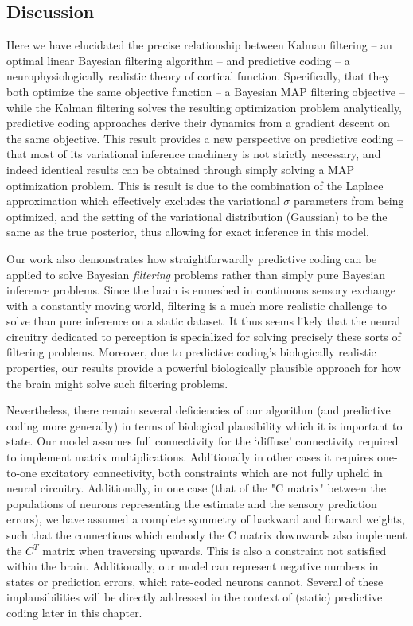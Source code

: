 \subsection{Discussion}

Here we have elucidated the precise relationship between Kalman filtering -- an optimal linear Bayesian filtering algorithm -- and predictive coding -- a neurophysiologically realistic theory of cortical function. Specifically, that they both optimize the same objective function -- a Bayesian MAP filtering objective -- while the Kalman filtering solves the resulting optimization problem analytically, predictive coding approaches derive their dynamics from a gradient descent on the same objective.  This result provides a new perspective on predictive coding -- that most of its variational inference machinery is not strictly necessary, and indeed identical results can be obtained through simply solving a MAP optimization problem. This is result is due to the combination of the Laplace approximation which effectively excludes the variational $\sigma$ parameters from being optimized, and the setting of the variational distribution (Gaussian) to be the same as the true posterior, thus allowing for exact inference in this model.

Our work also demonstrates how straightforwardly predictive coding can be applied to solve Bayesian \emph{filtering} problems rather than simply pure Bayesian inference problems. Since the brain is enmeshed in continuous sensory exchange with a constantly moving world, filtering is a much more realistic challenge to solve than pure inference on a static dataset. It thus seems likely that the neural circuitry dedicated to perception is specialized for solving precisely these sorts of filtering problems. Moreover, due to predictive coding's biologically realistic properties, our results provide a powerful biologically plausible approach for how the brain might solve such filtering problems.

Nevertheless, there remain several deficiencies of our algorithm (and predictive coding more generally) in terms of biological plausibility which it is important to state. Our model assumes full connectivity for the `diffuse' connectivity required to implement matrix multiplications. Additionally in other cases it requires one-to-one excitatory connectivity, both constraints which are not fully upheld in neural circuitry. Additionally, in one case (that of the "C matrix" between the populations of neurons representing the estimate and the sensory prediction errors), we have assumed a complete symmetry of backward and forward weights, such that the connections which embody the C matrix downwards also implement the $C^T$ matrix when traversing upwards. This is also a constraint not satisfied within the brain. Additionally, our model can represent negative numbers in states or prediction errors, which rate-coded neurons cannot. Several of these implausibilities will be directly addressed in the context of (static) predictive coding later in this chapter.

